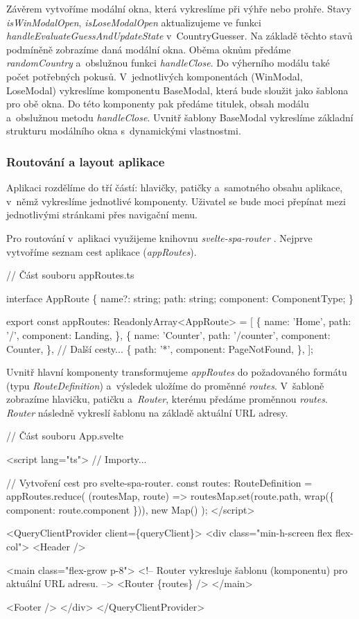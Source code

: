 Závěrem vytvoříme modální okna, která vykreslíme při výhře nebo prohře. Stavy \emph{isWinModalOpen}, \emph{isLoseModalOpen} aktualizujeme ve funkci \emph{handleEvaluateGuessAndUpdateState} v~CountryGuesser. 
Na základě těchto stavů podmíněně zobrazíme daná modální okna. Oběma oknům předáme \emph{randomCountry} a~obslužnou funkci \emph{handleClose}. Do výherního modálu také počet potřebných pokusů. 
V~jednotlivých komponentách (WinModal, LoseModal) vykreslíme komponentu BaseModal, která bude sloužit jako šablona pro obě okna. Do této komponenty pak předáme titulek, obsah modálu a~obslužnou metodu \emph{handleClose}. 
Uvnitř šablony BaseModal vykreslíme základní strukturu modálního okna s~dynamickými vlastnostmi.

\subsubsection*{Routování a layout aplikace}

Aplikaci rozdělíme do tří částí: hlavičky, patičky a~samotného obsahu aplikace, v~němž vykreslíme jednotlivé komponenty. Uživatel se bude moci přepínat mezi jednotlivými stránkami přes navigační menu. 

Pro routování v~aplikaci využijeme knihovnu \emph{svelte-spa-router} \cite{sveltesparouterlib}. Nejprve vytvoříme seznam cest aplikace (\emph{appRoutes}).

\begin{prog}
// Část souboru appRoutes.ts

interface AppRoute \{
  name?: string;
  path: string;
  component: ComponentType;
\}

export const appRoutes: ReadonlyArray<AppRoute> = [
  \{
    name: 'Home',
    path: '/',
    component: Landing,
  \},
  \{
    name: 'Counter',
    path: '/counter',
    component: Counter,
  \},
  // Další cesty...
  \{
    path: '*',
    component: PageNotFound,
  \},
];
\end{prog}

Uvnitř hlavní komponenty transformujeme \emph{appRoutes} do požadovaného formátu (typu \emph{RouteDefinition}) a~výsledek uložíme do proměnné \emph{routes}. 
V~šabloně zobrazíme hlavičku, patičku a~\emph{Router}, kterému předáme proměnnou \emph{routes}. 
\emph{Router} následně vykreslí šablonu na základě aktuální URL adresy.

\begin{prog}
// Část souboru App.svelte

<script lang="ts">
  // Importy...

  // Vytvoření cest pro svelte-spa-router.
  const routes: RouteDefinition = appRoutes.reduce(
    (routesMap, route) => routesMap.set(route.path, wrap(\{
      component: route.component
    \})),
    new Map()
  );
</script>

<QueryClientProvider client=\{queryClient\}>
  <div class="min-h-screen flex flex-col">
    <Header />

    <main class="flex-grow p-8">
      <!-- Router vykresluje šablonu (komponentu) pro aktuální URL adresu. -->
      <Router \{routes\} />
    </main>

    <Footer />
  </div>
</QueryClientProvider>
\end{prog}

